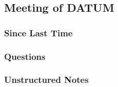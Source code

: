 
\subsection{Meeting of DATUM}
\subsubsection{Since Last Time}
\subsubsection{Questions}
\subsubsection{Unstructured Notes}